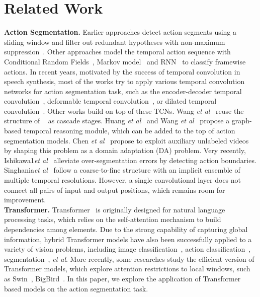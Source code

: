 \documentclass{bmvc2k}
\def\etal{\emph{et al}\bmvaOneDot}
\begin{document}
\section{Related Work}
\noindent
\textbf{Action Segmentation.} Earlier approaches detect action segments using a sliding window and filter out redundant hypotheses with non-maximum suppression~\cite{sliding1,sliding2}. Other approaches model the temporal action sequence with Conditional Random Fields~\cite{crf2,crf3,CRFs}, Markov model~\cite{HTK(64),hmm2} and RNN~\cite{lstm1,lstm2,lstm3,bi-lstm,lstm4} to classify framewise actions. In recent years, motivated by the success of temporal convolution in speech synthesis, most of the works try to apply various temporal convolution networks for action segmentation task, such as the encoder-decoder temporal convolution~\cite{ED-TCN,TCFPN}, deformable temporal convolution~\cite{TDRN}, or dilated temporal convolution~\cite{MSTCN,timeception}. Other works build on top of these TCNs. Wang \etal~\cite{BCN} reuse the structure of ~\cite{MSTCN} as cascade stages. Huang \etal~\cite{GCN1} and Wang \etal~\cite{GCN2} propose a graph-based temporal reasoning module, which can be added to the top of action segmentation models. Chen \etal~\cite{da1} propose to exploit auxiliary unlabeled videos by
shaping this problem as a domain adaptation (DA) problem. Very recently, Ishikawa1\etal~\cite{bound2} alleviate over-segmentation errors by detecting action boundaries. Singhania\etal~\cite{C2F} follow a coarse-to-fine structure with an implicit ensemble of multiple temporal resolutions. However, a single convolutional layer does not connect all pairs of input and output positions, which remains room for improvement. \\
\noindent
\textbf{Transformer.} Transformer~\cite{att_all_you_need} is originally designed for natural language processing tasks, which relies on the self-attention mechanism to build dependencies among elements. Due to the strong capability of capturing global information, hybrid Transformer models have also been successfully applied to a variety of vision problems, including image classification~\cite{transformer_cls1,transformer_cls2,transformer_cls3,transformer_cls4,transformer_cls5}, action classification~\cite{transformer_action1}, segmentation~\cite{transformer_seg1,transformer_seg2,transformer_seg3}, \etal. More recently, some researches study the efficient version of Transformer models, which explore attention restrictions to local windows, such as Swin~\cite{swin}, BigBird~\cite{bigbird}. In this paper, we explore the application of Transformer based models on the action segmentation task.
\end{document}
